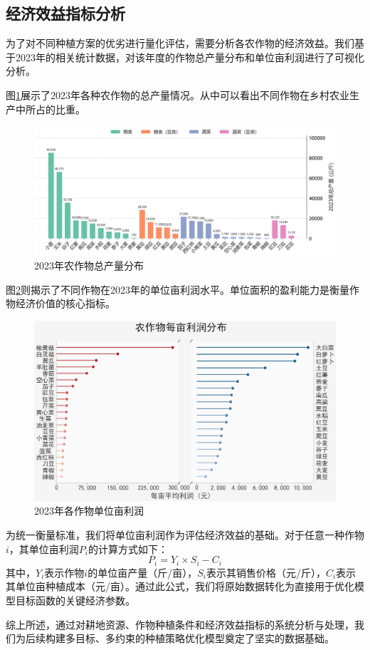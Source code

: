 \subsection{经济效益指标分析}

为了对不同种植方案的优劣进行量化评估，需要分析各农作物的经济效益。我们基于2023年的相关统计数据，对该年度的作物总产量分布和单位亩利润进行了可视化分析。

图\ref{fig:production_distribution_2023}展示了2023年各种农作物的总产量情况。从中可以看出不同作物在乡村农业生产中所占的比重。

\begin{figure}[htbp]
    \centering
    \includegraphics[width=\textwidth]{figs/2数据分析与预处理/2023年产量分布.png}
    \caption{2023年农作物总产量分布}
    \label{fig:production_distribution_2023}
\end{figure}

图\ref{fig:profit_per_mu_2023}则揭示了不同作物在2023年的单位亩利润水平。单位面积的盈利能力是衡量作物经济价值的核心指标。

\begin{figure}[htbp]
    \centering
    \includegraphics[width=\textwidth]{figs/2数据分析与预处理/2023年单位亩利润}
    \caption{2023年各作物单位亩利润}
    \label{fig:profit_per_mu_2023}
\end{figure}

为统一衡量标准，我们将单位亩利润作为评估经济效益的基础。对于任意一种作物$i$，其单位亩利润$P_i$的计算方式如下：
\begin{equation}
    P_i = Y_i \times S_i - C_i
    \label{eq:profit}
\end{equation}
其中，$Y_i$表示作物$i$的单位亩产量（斤/亩），$S_i$表示其销售价格（元/斤），$C_i$表示其单位亩种植成本（元/亩）。通过此公式，我们将原始数据转化为直接用于优化模型目标函数的关键经济参数。

综上所述，通过对耕地资源、作物种植条件和经济效益指标的系统分析与处理，我们为后续构建多目标、多约束的种植策略优化模型奠定了坚实的数据基础。
